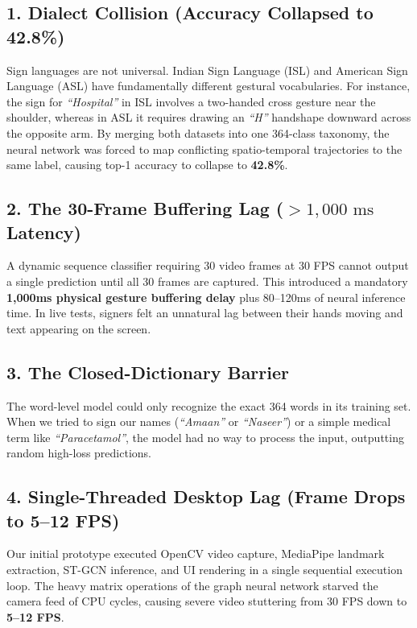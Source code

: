 \subsection{1. Dialect Collision (Accuracy Collapsed to 42.8\%)}
Sign languages are not universal. Indian Sign Language (ISL) and American Sign Language (ASL) have fundamentally different gestural vocabularies. For instance, the sign for \textit{``Hospital''} in ISL involves a two-handed cross gesture near the shoulder, whereas in ASL it requires drawing an \textit{``H''} handshape downward across the opposite arm. By merging both datasets into one 364-class taxonomy, the neural network was forced to map conflicting spatio-temporal trajectories to the same label, causing top-1 accuracy to collapse to \textbf{42.8\%}.

\subsection{2. The 30-Frame Buffering Lag ($>1,000\text{ ms}$ Latency)}
A dynamic sequence classifier requiring 30 video frames at 30 FPS cannot output a single prediction until all 30 frames are captured. This introduced a mandatory \textbf{1,000ms physical gesture buffering delay} plus 80--120ms of neural inference time. In live tests, signers felt an unnatural lag between their hands moving and text appearing on the screen.

\subsection{3. The Closed-Dictionary Barrier}
The word-level model could only recognize the exact 364 words in its training set. When we tried to sign our names (\textit{``Amaan''} or \textit{``Naseer''}) or a simple medical term like \textit{``Paracetamol''}, the model had no way to process the input, outputting random high-loss predictions.

\subsection{4. Single-Threaded Desktop Lag (Frame Drops to 5--12 FPS)}
Our initial prototype executed OpenCV video capture, MediaPipe landmark extraction, ST-GCN inference, and UI rendering in a single sequential execution loop. The heavy matrix operations of the graph neural network starved the camera feed of CPU cycles, causing severe video stuttering from 30 FPS down to \textbf{5--12 FPS}.


